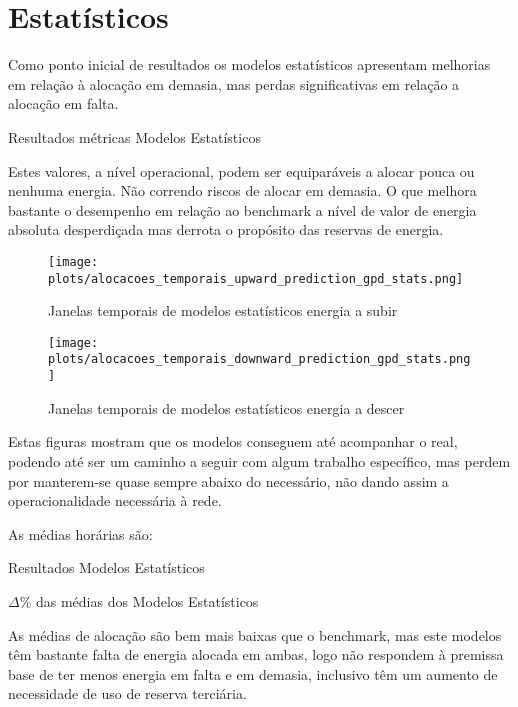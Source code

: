 \section{Estatísticos \label{se:resstats}}
Como ponto inicial de resultados os modelos estatísticos apresentam melhorias em relação à alocação em demasia, mas perdas significativas em relação a alocação em falta.\par

\begin{table}[H]
    \caption{Resultados métricas Modelos Estatísticos}    
    \resizebox{\linewidth}{!}{}
    \label{tab:statsmetrics}
    \end{table}

Estes valores, a nível operacional, podem ser equiparáveis a alocar pouca ou nenhuma energia. Não correndo riscos de alocar em demasia. O que melhora bastante o desempenho em relação ao benchmark a nível de valor de energia absoluta desperdiçada mas derrota o propósito das reservas de energia.\par

\begin{figure}[H]
    \centering
    \texttt{[image: plots/alocacoes\_temporais\_upward\_prediction\_gpd\_stats.png]}
    \caption{Janelas temporais de modelos estatísticos energia a subir}
    \label{fig:statstimewindowsup}
\end{figure}


\begin{figure}[H]
    \centering
    \texttt{[image: plots/alocacoes\_temporais\_downward\_prediction\_gpd\_stats.png]}
    \caption{Janelas temporais de modelos estatísticos energia a descer}
    \label{fig:statstimewindowsdown}
\end{figure}

Estas figuras mostram que os modelos conseguem até acompanhar o real, podendo até ser um caminho a seguir com algum trabalho específico, mas perdem por manterem-se quase sempre abaixo do necessário, não dando assim a operacionalidade necessária à rede.\par
As médias horárias são:\\
\begin{table}[H]
    \resizebox{\linewidth}{!}{}
    \caption{Resultados Modelos Estatísticos}
    \label{tab:statsres}
    \end{table}



\begin{table}[H]
    \resizebox{\linewidth}{!}{}
    \caption{$\Delta$\% das médias dos Modelos Estatísticos}    
    \label{tab:statsres_deltas}
    \end{table}

As médias de alocação são bem mais baixas que o benchmark, mas este modelos têm bastante falta de energia alocada em ambas, logo não respondem à premissa base de ter menos energia em falta e em demasia, inclusivo têm um aumento de necessidade de uso de reserva terciária.\par
